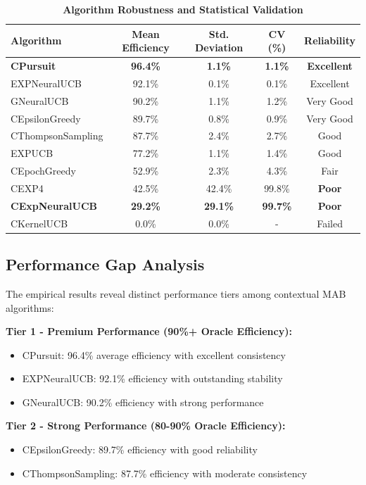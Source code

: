 \documentclass[12pt,a4paper]{article}
\newcommand{\critical}[1]{\textcolor{criticalcolor}{\textbf{#1}}}
\newcommand{\success}[1]{\textcolor{successcolor}{\textbf{#1}}}
\begin{document}
\begin{table}[H]
\centering
\caption{\success{Algorithm Robustness and Statistical Validation}}
\begin{tabular}{|l|c|c|c|c|}
\hline
\textbf{Algorithm} & \textbf{Mean Efficiency} & \textbf{Std. Deviation} & \textbf{CV (\%)} & \textbf{Reliability} \\
\hline
\hline
\success{CPursuit} & \success{96.4\%} & \success{1.1\%} & \success{1.1\%} & \success{Excellent} \\
EXPNeuralUCB & 92.1\% & 0.1\% & 0.1\% & Excellent \\
GNeuralUCB & 90.2\% & 1.1\% & 1.2\% & Very Good \\
CEpsilonGreedy & 89.7\% & 0.8\% & 0.9\% & Very Good \\
CThompsonSampling & 87.7\% & 2.4\% & 2.7\% & Good \\
EXPUCB & 77.2\% & 1.1\% & 1.4\% & Good \\
CEpochGreedy & 52.9\% & 2.3\% & 4.3\% & Fair \\
CEXP4 & 42.5\% & 42.4\% & 99.8\% & \critical{Poor} \\
\critical{CExpNeuralUCB} & \critical{29.2\%} & \critical{29.1\%} & \critical{99.7\%} & \critical{Poor} \\
CKernelUCB & 0.0\% & 0.0\% & - & Failed \\
\hline
\end{tabular}
\end{table}

\subsection{Performance Gap Analysis}

The empirical results reveal distinct performance tiers among contextual MAB algorithms:

\textbf{Tier 1 - Premium Performance (90\%+ Oracle Efficiency):}
\begin{itemize}
\item CPursuit: 96.4\% average efficiency with excellent consistency
\item EXPNeuralUCB: 92.1\% efficiency with outstanding stability
\item GNeuralUCB: 90.2\% efficiency with strong performance
\end{itemize}

\textbf{Tier 2 - Strong Performance (80-90\% Oracle Efficiency):}
\begin{itemize}
\item CEpsilonGreedy: 89.7\% efficiency with good reliability
\item CThompsonSampling: 87.7\% efficiency with moderate consistency
\end{itemize}
\end{document}
